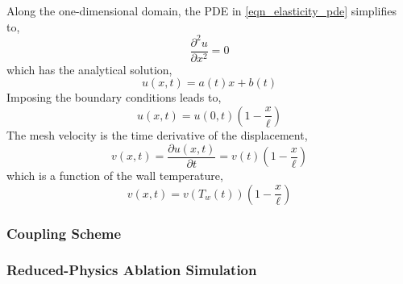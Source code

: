 Along the one-dimensional domain, the PDE in \cref{eqn_elasticity_pde} simplifies to,
\begin{equation}
    \frac{\partial^2 u}{\partial x^2} = 0
\end{equation}
which has the analytical solution,
\begin{equation}
    u(x,t) = a(t)x + b(t)
\end{equation}
Imposing the boundary conditions leads to,
\begin{equation}
    u(x,t) = u(0,t)\left(1 - \frac{x}{\ell}\right)
\end{equation}
The mesh velocity is the time derivative of the displacement,
\begin{equation}
    v(x,t) = \frac{\partial u(x,t)}{\partial t} = v(t)\left(1 - \frac{x}{\ell}\right)
\end{equation}
which is a function of the wall temperature,
\begin{equation}
    v(x,t) = v(T_w(t)) \left(1 - \frac{x}{\ell}\right)
\end{equation}

\subsubsection{Coupling Scheme}

\subsubsection{Reduced-Physics Ablation Simulation}







